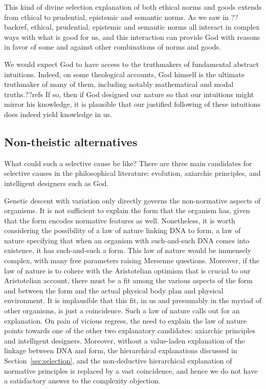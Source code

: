 This kind of divine selection explanation of both ethical norms and goods extends from ethical to prudential, epistemic and 
semantic norms. As we saw in ??backref, ethical, prudential, epistemic and semantic norms all interact in complex ways with 
what is good for us, and this interaction can provide God with reasons in favor of some and against other combinations of
norms and goods.

We would expect God to have access to the truthmakers of fundamental abstract intuitions. Indeed, on some theological accounts,
God himself is the ultimate truthmaker of many of them, including notably mathematical and modal truths.??refs If so, then 
if God designed our nature so that our intuitions might mirror his knowledge, it is plausible that our justified following of
these intuitions does indeed yield knowledge in us.

\subsection{Non-theistic alternatives}
What could such a selective cause be like? There are three main candidates for selective causes in the philosophical
literature: evolution, axiarchic principles, and intelligent designers such as God. 

Genetic descent with variation only directly governs the non-normative aspects of organisms. It is not sufficient to explain
the form that the organism has, given that the form encodes normative features as well. Nonetheless, it is worth considering
the possibility of a law of nature linking DNA to form, a law of nature specifying that when an organism with such-and-such 
DNA comes into existence, it has such-and-such a form. This law of nature would be immensely complex, with many free parameters
raising Mersenne questions. Moreover, if the law of nature is to cohere with the Aristotelian optimism that is crucial to our
Aristotelian account, there must be a fit among the various aspects of the form and between the form and the actual physical 
body plan and physical environment. It is implausible that this fit, in us and presumably in the myriad of other organisms,
is just a coincidence. Such a law of nature calls out for an explanation. On pain of vicious regress, the need to explain the 
law of nature points towards one of the other two explanatory candidates: axiarchic principles and intelligent designers.
Moreover, without a value-laden explanation of the linkage between DNA and form, the hierarchical explanations discussed 
in Section~\ref{sec:selection}, and the non-deductive hierarchical explanation of normative principles is replaced by a vast
coincidence, and hence we do not have a satisfactory answer to the complexity objection. 

